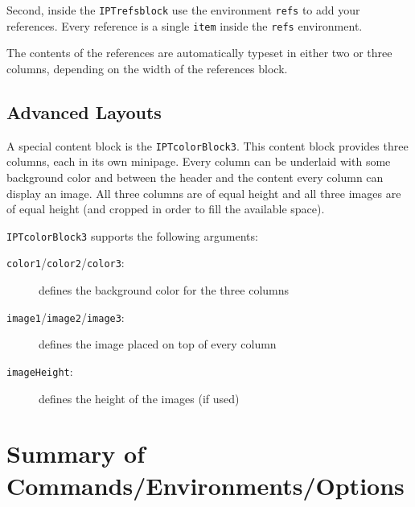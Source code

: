Second, inside the \texttt{IPTrefsblock} use the environment \texttt{refs} to add your references. Every reference is a single \texttt{\bs{}item} inside the \texttt{refs} environment. 

The contents of the references are automatically typeset in either two or three columns, depending on the width of the references block.


\subsection{Advanced Layouts}

A special content block is the \texttt{\bs{}IPTcolorBlock3}. This content block provides three columns, each in its own minipage. Every column can be underlaid with some background color and between the header and the content every column can display an image. All three columns are of equal height and all three images are of equal height (and cropped in order to fill the available space).

\texttt{IPTcolorBlock3} supports the following arguments:
\begin{description}
	\item[\texttt{color1}/\texttt{color2}/\texttt{color3}:] defines the background color for the three columns
	\item[\texttt{image1}/\texttt{image2}/\texttt{image3}:] defines the image placed on top of every column
	\item[\texttt{imageHeight}:] defines the height of the images (if used)
\end{description}




\section{Summary of Commands/Environments/Options}

